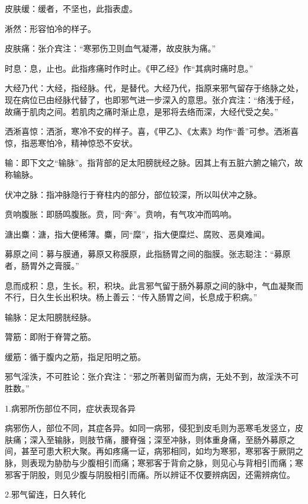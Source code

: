 \documentclass[draft,12pt]{ctexbook}
\begin{document}
\begin{jiaozhu}
	\item 皮肤缓：缓者，不坚也，此指表虚。
	\item 淅然：形容怕冷的样子。
	\item 皮肤痛：张介宾注：“寒邪伤卫则血气凝滞，故皮肤为痛。”
	\item 时息：息，止也。此指疼痛时作时止。《甲乙经》作“其病时痛时息。”
	\item 大经乃代：大经，指经脉。代，是替代。大经乃代，指原来邪气留存于络脉之处，现在病位已由经脉代替了，也即邪气进一步深入的意思。张介宾注：“络浅于经，故痛于肌肉之间。若肌肉之痛时渐止息，是邪将去络而深，大经代受之矣。”
	\item 洒淅喜惊：洒浙，寒冷不安的样子。喜，《甲乙》、《太素》均作“善”可参。洒淅喜惊，指恶寒怕冷，精神惊恐不安状。
	\item 输：即下文之“输脉”。指背部的足太阳膀胱经之脉。因其上有五脏六腑之输穴，故称输脉。
	\item 伏冲之脉：指冲脉隐行于脊柱内的部分，部位较深，所以叫伏冲之脉。
	\item 贲响腹胀：即肠鸣腹胀。贲，同“奔”。贲响，有气攻冲而鸣响。
	\item 溏出麋：溏，指大便稀薄。麋，同“糜”，指大便糜烂、腐败、恶臭难闻。
	\item 募原之间：募与膜通，募原又称膜原，此指肠胃之间的脂膜。张志聪注：“募原者，肠胃外之膏膜。”
	\item 息而成积：息，生长。积，积块。此言邪气留于肠外募原之间的脉中，气血凝聚而不行，日久生长出积块。杨上善云：“传入肠胃之间，长息成于积病。”
	\item 输脉：足太阳膀胱经脉。
	\item 膂筋：即附于脊膂之筋。
	\item 缓筋：循于腹内之筋，指足阳明之筋。
	\item 邪气淫泆，不可胜论：张介宾注：“邪之所著则留而为病，无处不到，故淫泆不可胜数。”
\end{jiaozhu}


1.病邪所伤部位不同，症状表现各异

病邪伤人，部位不同，其症各异。如同一病邪，侵犯到皮毛则为恶寒毛发竖立，皮肤痛；深入至输脉，则肢节痛，腰脊强；深至冲脉，则体重身痛，至肠外募原之间，甚至可患大积大聚。再如疼痛一证，病邪相同，如均为寒邪，寒邪客于厥阴之脉，则表现为胁肋与少腹相引而痛；寒邪客于背俞之脉，则见心与背相引而痛；寒邪客于阴股，则见少腹与阴股相引而痛。所以辨证不仅要辨病因，还需辨病位。

2.邪气留连，日久转化
\end{document}
